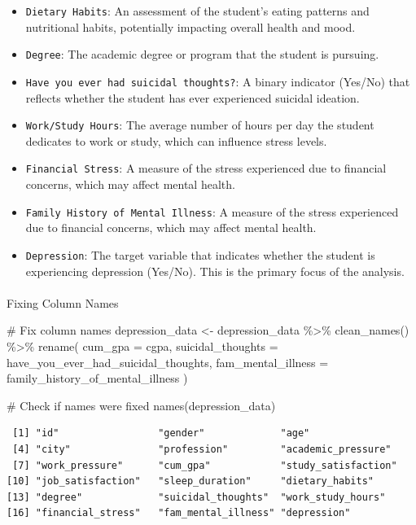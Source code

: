 \documentclass[
  letterpaper,
  DIV=11,
  numbers=noendperiod]{scrartcl}
\makeatletter
\let\oldparagraph\paragraph
\renewcommand{\paragraph}{
    \@ifstar
      \xxxParagraphStar
      \xxxParagraphNoStar
  }
\newcommand{\xxxParagraphStar}[1]{\oldparagraph*{#1}\mbox{}}
\newcommand{\xxxParagraphNoStar}[1]{\oldparagraph{#1}\mbox{}}
\newenvironment{Shaded}{\begin{snugshade}}{\end{snugshade}}
\newcommand{\AttributeTok}[1]{\textcolor[rgb]{0.40,0.45,0.13}{#1}}
\newcommand{\CommentTok}[1]{\textcolor[rgb]{0.37,0.37,0.37}{#1}}
\newcommand{\FunctionTok}[1]{\textcolor[rgb]{0.28,0.35,0.67}{#1}}
\newcommand{\NormalTok}[1]{\textcolor[rgb]{0.00,0.23,0.31}{#1}}
\newcommand{\OtherTok}[1]{\textcolor[rgb]{0.00,0.23,0.31}{#1}}
\newcommand{\SpecialCharTok}[1]{\textcolor[rgb]{0.37,0.37,0.37}{#1}}
\makeatother
\begin{document}
\begin{itemize}
\item
  \texttt{Dietary\ Habits}: An assessment of the student's eating
  patterns and nutritional habits, potentially impacting overall health
  and mood.
\item
  \texttt{Degree}: The academic degree or program that the student is
  pursuing.
\item
  \texttt{Have\ you\ ever\ had\ suicidal\ thoughts?}: A binary indicator
  (Yes/No) that reflects whether the student has ever experienced
  suicidal ideation.
\item
  \texttt{Work/Study\ Hours}: The average number of hours per day the
  student dedicates to work or study, which can influence stress levels.
\item
  \texttt{Financial\ Stress}: A measure of the stress experienced due to
  financial concerns, which may affect mental health.
\item
  \texttt{Family\ History\ of\ Mental\ Illness}: A measure of the stress
  experienced due to financial concerns, which may affect mental health.
\item
  \texttt{Depression}: The target variable that indicates whether the
  student is experiencing depression (Yes/No). This is the primary focus
  of the analysis.
\end{itemize}

\paragraph{Fixing Column Names}\label{fixing-column-names}

\begin{Shaded}
\begin{Highlighting}[numbers=left,,]
\CommentTok{\# Fix column names}
\NormalTok{depression\_data }\OtherTok{\textless{}{-}}\NormalTok{ depression\_data }\SpecialCharTok{\%\textgreater{}\%} 
  \FunctionTok{clean\_names}\NormalTok{() }\SpecialCharTok{\%\textgreater{}\%}
  \FunctionTok{rename}\NormalTok{(}
    \AttributeTok{cum\_gpa =}\NormalTok{ cgpa,}
    \AttributeTok{suicidal\_thoughts =}\NormalTok{ have\_you\_ever\_had\_suicidal\_thoughts,}
    \AttributeTok{fam\_mental\_illness =}\NormalTok{ family\_history\_of\_mental\_illness}
\NormalTok{  )}

\CommentTok{\# Check if names were fixed}
\FunctionTok{names}\NormalTok{(depression\_data)}
\end{Highlighting}
\end{Shaded}

\begin{verbatim}
 [1] "id"                 "gender"             "age"               
 [4] "city"               "profession"         "academic_pressure" 
 [7] "work_pressure"      "cum_gpa"            "study_satisfaction"
[10] "job_satisfaction"   "sleep_duration"     "dietary_habits"    
[13] "degree"             "suicidal_thoughts"  "work_study_hours"  
[16] "financial_stress"   "fam_mental_illness" "depression"        
\end{verbatim}
\end{document}
